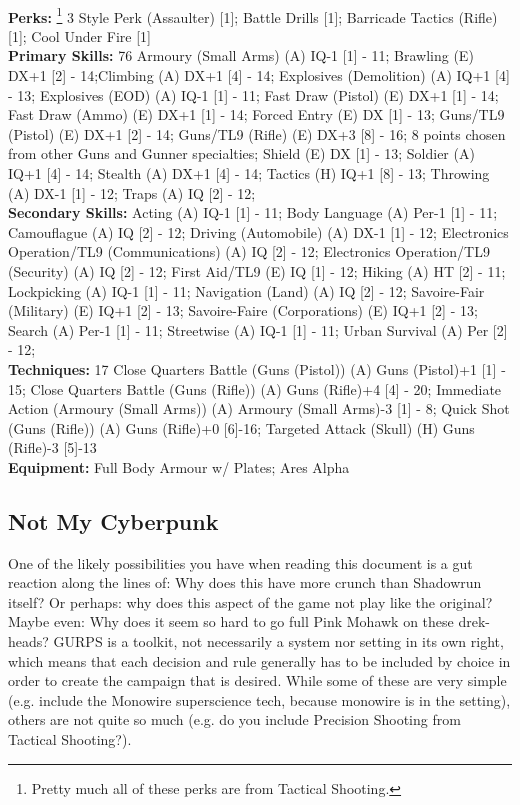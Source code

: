 \begin{multicols*}{2}
	\textbf{\\Perks: }\footnote{Pretty much all of these perks are from Tactical Shooting.} 3 
	Style Perk (Assaulter) [1]; Battle Drills [1]; Barricade Tactics (Rifle) [1]; Cool Under Fire [1]\\
	
	\textbf{Primary Skills: } 76
	Armoury (Small Arms) (A) IQ-1 [1] - 11; Brawling (E) DX+1 [2] - 14;Climbing (A) DX+1 [4] - 14; Explosives (Demolition) (A) IQ+1 [4] - 13; Explosives (EOD) (A) IQ-1 [1] - 11; Fast Draw (Pistol) (E) DX+1 [1] - 14; Fast Draw (Ammo) (E) DX+1 [1] - 14; Forced Entry (E) DX [1] - 13; Guns/TL9 (Pistol) (E) DX+1 [2] - 14; Guns/TL9 (Rifle) (E) DX+3 [8] - 16; 8 points chosen from other Guns and Gunner specialties; Shield (E) DX [1] - 13; Soldier (A) IQ+1 [4] - 14; Stealth (A) DX+1 [4] - 14; Tactics (H) IQ+1 [8] - 13; Throwing (A) DX-1 [1] - 12; Traps (A) IQ [2] - 12; \\
	
	\textbf{Secondary Skills: }
	Acting (A) IQ-1 [1] - 11; Body Language (A) Per-1 [1] - 11;  Camouflague (A) IQ [2] - 12; Driving (Automobile) (A) DX-1 [1] - 12; Electronics Operation/TL9 (Communications) (A) IQ [2] - 12; Electronics Operation/TL9 (Security) (A) IQ [2] - 12; First Aid/TL9 (E) IQ [1] - 12; Hiking (A) HT [2] - 11; Lockpicking (A) IQ-1 [1] - 11; Navigation (Land) (A) IQ [2] - 12; Savoire-Fair (Military) (E) IQ+1 [2] - 13; Savoire-Faire (Corporations) (E) IQ+1 [2] - 13; Search (A) Per-1 [1] - 11; Streetwise (A) IQ-1 [1] - 11; Urban Survival (A) Per [2] - 12;\\
	
	\textbf{Techniques: } 17
	Close Quarters Battle (Guns (Pistol)) (A) Guns (Pistol)+1 [1] - 15; Close Quarters Battle (Guns (Rifle)) (A) Guns (Rifle)+4 [4] - 20; Immediate Action (Armoury (Small Arms)) (A) Armoury (Small Arms)-3 [1] - 8; Quick Shot (Guns (Rifle)) (A) Guns (Rifle)+0 [6]-16; Targeted Attack (Skull) (H) Guns (Rifle)-3 [5]-13\\
	
	\textbf{Equipment: }
	Full Body Armour w/ Plates; Ares Alpha
	
	\subsection{Not My Cyberpunk}
	
	One of the likely possibilities you have when reading this document is a gut reaction along the lines of: Why does this have more crunch than Shadowrun itself? Or perhaps: why does this aspect of the game not play like the original? Maybe even: Why does it seem so hard to go full Pink Mohawk on these drek-heads? GURPS is a toolkit, not necessarily a system nor setting in its own right, which means that each decision and rule generally has to be included by choice in order to create the campaign that is desired. While some of these are very simple (e.g. include the Monowire superscience tech, because monowire is in the setting), others are not quite so much (e.g. do you include Precision Shooting from Tactical Shooting?).
	

\end{multicols*}
